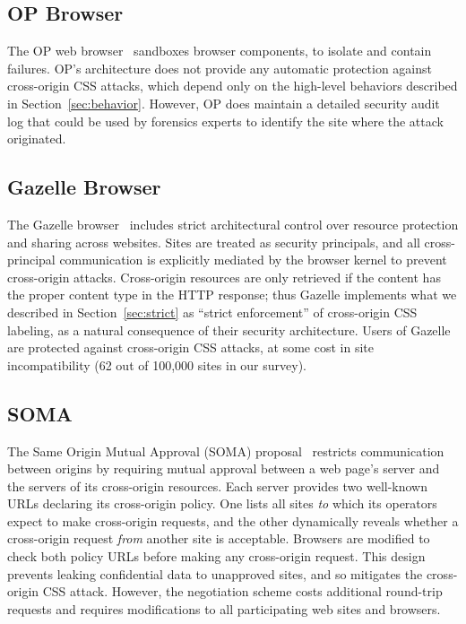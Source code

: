 \documentclass{acm_proc_article-sp}
\begin{document}
\subsection{OP Browser}
The OP web browser~\cite{op-browser} sandboxes browser components, to
isolate and contain failures.  OP's architecture does not provide any
automatic protection against cross-origin CSS attacks, which depend
only on the high-level behaviors described in
Section~\ref{sec:behavior}.  However, OP does maintain a detailed
security audit log that could be used by forensics experts to identify
the site where the attack originated.

\subsection{Gazelle Browser}
The Gazelle browser~\cite{gazelle} includes strict architectural
control over resource protection and sharing across websites.  Sites
are treated as security principals, and all cross-principal
communication is explicitly mediated by the browser kernel to prevent
cross-origin attacks.  Cross-origin resources are only retrieved if
the content has the proper content type in the HTTP response; thus
Gazelle implements what we described in Section~\ref{sec:strict} as
“strict enforcement” of cross-origin CSS labeling, as a natural
consequence of their security architecture.  Users of Gazelle are
protected against cross-origin CSS attacks, at some cost in site
incompatibility (62 out of 100,000 sites in our survey).

\subsection{SOMA}
The Same Origin Mutual Approval (SOMA) proposal~\cite{soma} restricts
communication between origins by requiring mutual approval between a
web page's server and the servers of its cross-origin resources.  Each
server provides two well-known URLs declaring its cross-origin policy.
One lists all sites \emph{to} which its operators expect to make
cross-origin requests, and the other dynamically reveals whether a
cross-origin request \emph{from} another site is acceptable.  Browsers
are modified to check both policy URLs before making any cross-origin
request.  This design prevents leaking confidential data to unapproved
sites, and so mitigates the cross-origin CSS attack. However, the
negotiation scheme costs additional round-trip requests and requires
modifications to all participating web sites and browsers.
\end{document}
